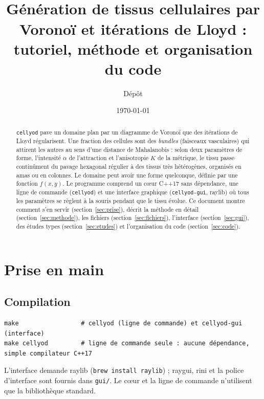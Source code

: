 \documentclass[10pt,a4paper]{article}
\title{\cy{}\\[3pt]
  \large Génération de tissus cellulaires par Voronoï et itérations de Lloyd :\\
  tutoriel, méthode et organisation du code}
\author{Dépôt \code{cellYOd}}
\date{\today}
\newcommand{\code}[1]{\texttt{#1}}
\newcommand{\cy}{\code{cellyod}}
\newcommand{\cyg}{\code{cellyod-gui}}
\begin{document}
\maketitle

\begin{abstract}
  \cy{} pave un domaine plan par un diagramme de Voronoï que des itérations de Lloyd régularisent. Une fraction
  des cellules sont des \emph{bundles} (faisceaux vasculaires) qui attirent les autres au sens d'une distance de
  Mahalanobis : selon deux paramètres de forme, l'intensité $\alpha$ de l'attraction et l'anisotropie $K$ de la
  métrique, le tissu passe continûment du pavage hexagonal régulier à des tissus très hétérogènes, organisés en
  amas ou en colonnes. Le domaine peut avoir une forme quelconque, définie par une fonction $f(x,y)$. Le
  programme comprend un cœur C++17 sans dépendance, une ligne de commande (\cy) et une interface graphique
  (\cyg, raylib) où tous les paramètres se règlent à la souris pendant que le tissu évolue. Ce document montre
  comment s'en servir (section~\ref{sec:prise}), décrit la méthode en détail (section~\ref{sec:methode}),
  les fichiers (section~\ref{sec:fichiers}), l'interface (section~\ref{sec:gui}), des études types
  (section~\ref{sec:etudes}) et l'organisation du code (section~\ref{sec:code}).
\end{abstract}

\tableofcontents

\section{Prise en main}\label{sec:prise}

\subsection{Compilation}

\begin{lstlisting}
make                 # cellyod (ligne de commande) et cellyod-gui (interface)
make cellyod         # ligne de commande seule : aucune dépendance, simple compilateur C++17
\end{lstlisting}
L'interface demande raylib (\code{brew install raylib}) ; raygui, rini et la police d'interface sont fournis
dans \code{gui/}. Le cœur et la ligne de commande n'utilisent que la bibliothèque standard.
\end{document}
